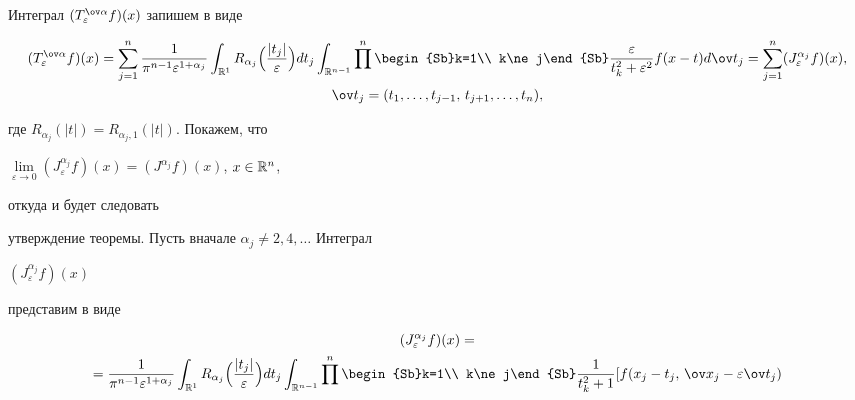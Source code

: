 \begin{pf}


Интеграл $(T^{\ov\alpha}_\varepsilon f)(x)$ запишем в виде


\begin{gather}


(T^{\ov\alpha}_\varepsilon f)(x)=


\sum^n_{j=1}\frac{1}{\pi^{n-1}\varepsilon^{1+\alpha_j}}


\int_{\Bbb R^1}R_{\alpha_j}\Bigl(\frac{|t_j|}{\varepsilon}\Bigr)


dt_j\int_{\Bbb R^{n-1}}


\prod^n\begin{Sb}k=1\\ k\ne j\end{Sb}


\frac{\varepsilon}{t^2_k+\varepsilon^2}f(x-t)d\ov t_j=


\sum^n_{j=1}(J^{\alpha_j}_\varepsilon f)(x),\\


\ov t_j=(t_1,\dotsc,t_{j-1},\,t_{j+1},\dotsc,t_n),\notag


\end{gather}


где $R_{\alpha_j}(|t|)=R_{\alpha_j,1}(|t|)$. Покажем, что


$\lim\limits_{\varepsilon\to 0}(J^{\alpha_j}_\varepsilon f)(x)=


(J^{\alpha_j}f)(x)$, $x\in\Bbb R^n$,


откуда и будет следовать


утверждение теоремы. Пусть вначале $\alpha_j\ne 2,4,\dotsc$ Интеграл


$(J^{\alpha_j}_\varepsilon f)(x)$


представим в виде


\begin{multline*}


(J^{\alpha_j}_\varepsilon f)(x)=\\


=\frac{1}{\pi^{n-1}\varepsilon^{1+\alpha_j}}\int_{\Bbb R^1}


R_{\alpha_j}\Bigl(\frac{|t_j|}{\varepsilon}\Bigr)dt_j


\int_{\Bbb R^{n-1}}


\prod^n\begin{Sb}k=1\\ k\ne j\end{Sb}


\frac{1}{t^2_k+1}[f(x_j-t_j,\,\ov x_j-\varepsilon\ov t_j)



\end{multline*}
\end{pf}
